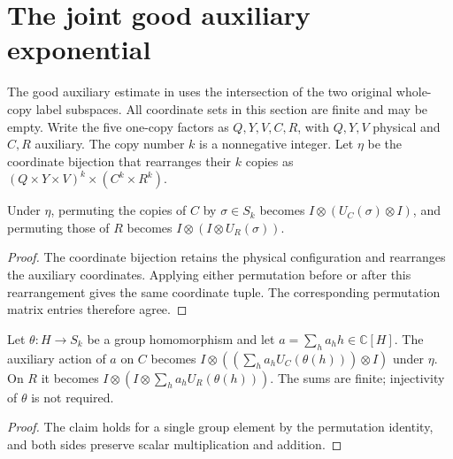 \section{The joint good auxiliary exponential}

The good auxiliary estimate in \cite[Section~8]{OpenAI2026AreaLaw}
uses the intersection of the two original whole-copy label subspaces.
All coordinate sets in this section are finite and may be empty.
Write the five one-copy factors as $Q,Y,V,C,R$, with $Q,Y,V$ physical
and $C,R$ auxiliary. The copy number $k$ is a nonnegative integer.
Let $\eta$ be the coordinate bijection that rearranges their $k$ copies
as $(Q\times Y\times V)^k\times(C^k\times R^k)$.

\begin{theorem}
  \label{thm:five_factor_auxiliary_permutations}
  \leanok
  Under $\eta$, permuting the copies of $C$ by $\sigma\in S_k$ becomes
  $I\otimes(U_C(\sigma)\otimes I)$, and permuting those of $R$ becomes
  $I\otimes(I\otimes U_R(\sigma))$.
\end{theorem}
\begin{proof}
  \leanok
  The coordinate bijection retains the physical configuration and
  rearranges the auxiliary coordinates. Applying either permutation
  before or after this rearrangement gives the same coordinate tuple.
  The corresponding permutation matrix entries therefore agree.
\end{proof}

\begin{theorem}
  \label{thm:five_factor_auxiliary_group_algebra}
  \leanok
  Let $\theta\colon H\to S_k$ be a group homomorphism and let
  $a=\sum_h a_hh\in\mathbb C[H]$. The auxiliary action of $a$ on $C$
  becomes $I\otimes((\sum_h a_hU_C(\theta(h)))\otimes I)$ under $\eta$.
  On $R$ it becomes $I\otimes(I\otimes\sum_h a_hU_R(\theta(h)))$.
  The sums are finite; injectivity of $\theta$ is not required.
\end{theorem}
\begin{proof}
  \leanok
  The claim holds for a single group element by the permutation
  identity, and both sides preserve scalar multiplication and addition.
\end{proof}

